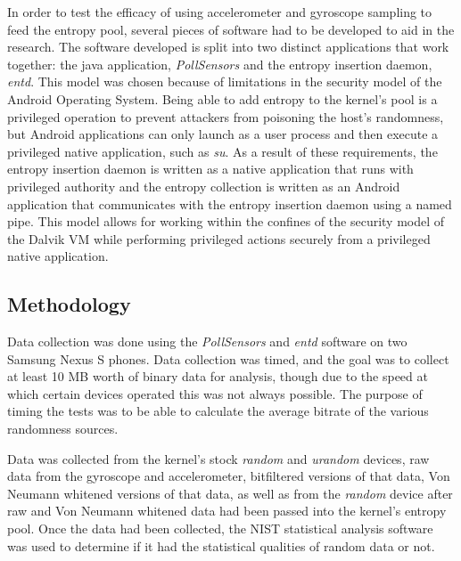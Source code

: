 In order to test the efficacy of using accelerometer and gyroscope sampling to
feed the entropy pool, several pieces of software had to be developed to aid in
the research. The software developed is split into two distinct applications
that work together: the java application, \textit{PollSensors} and the entropy
insertion daemon, \textit{entd}. This model was chosen because of limitations in
the security model of the Android Operating System. Being able to add entropy to
the kernel's pool is a privileged operation to prevent attackers from poisoning
the host's randomness, but Android applications can only launch as a user
process and then execute a privileged native application, such as \textit{su}.
As a result of these requirements, the entropy insertion daemon is written as a
native application that runs with privileged authority and the entropy
collection is written as an Android application that communicates with the
entropy insertion daemon using a named pipe. This model allows for working
within the confines of the security model of the Dalvik VM while performing
privileged actions securely from a privileged native application.

\subsection{Methodology}

Data collection was done using the \textit{PollSensors} and \textit{entd}
software on two Samsung Nexus S phones. Data collection was timed, and the goal
was to collect at least 10 MB worth of binary data for analysis, though due to
the speed at which certain devices operated this was not always possible. The
purpose of timing the tests was to be able to calculate the average bitrate of
the various randomness sources.

Data was collected from the kernel's stock \textit{random} and \textit{urandom}
devices, raw data from the gyroscope and accelerometer, bitfiltered versions of
that data, Von Neumann whitened versions of that data, as well as from the
\textit{random} device after raw and Von Neumann whitened data had been passed
into the kernel's entropy pool. Once the data had been collected, the NIST
statistical analysis software was used to determine if it had the statistical
qualities of random data or not.

